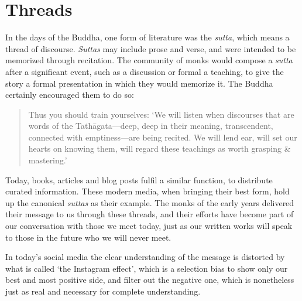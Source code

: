 \vfill\null
\clearpage
\normalpagelayout

\section{Threads}


\noindent In the days of the Buddha, one form of literature was the
\emph{sutta}, which means a thread of discourse. \emph{Suttas} may
include prose and verse, and were intended to be memorized through
recitation. The community of monks would compose a \emph{sutta} after a
significant event, such as a discussion or formal a teaching, to give
the story a formal presentation in which they would memorize it. The
Buddha certainly encouraged them to do so:

\begin{quote}
Thus you should train yourselves: `We will listen when discourses that
are words of the Tathāgata---deep, deep in their meaning, transcendent,
connected with emptiness---are being recited. We will lend ear, will set
our hearts on knowing them, will regard these teachings as worth
grasping \& mastering.'

\bigskip

\end{quote}

Today, books, articles and blog posts fulfil a similar function, to
distribute curated information. These modern media, when bringing their
best form, hold up the canonical \emph{suttas} as their example. The
monks of the early years delivered their message to us through these
threads, and their efforts have become part of our conversation with
those we meet today, just as our written works will speak to those in
the future who we will never meet.

\clearpage

\vspace*{-\baselineskip}


In today's social media the clear understanding of the message is
distorted by what is called `the Instagram effect', which is a selection
bias to show only our best and most positive side, and filter out the
negative one, which is nonetheless just as real and necessary for
complete understanding.

